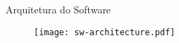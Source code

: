 \begin{frame}{Arquitetura do Software}
	\begin{figure}
		\centering
		\texttt{[image: sw-architecture.pdf]}
	\end{figure}
\end{frame}